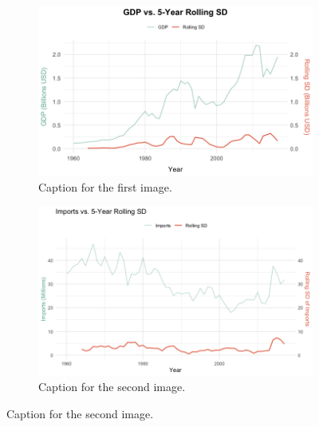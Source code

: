 \documentclass[11pt]{article}
\begin{document}
\begin{figure}[htbp]
  \begin{subfigure}[b]{0.48\textwidth}
    \centering
    \includegraphics[width=\linewidth]{EDA/GDP_RollingSD5.png} %
    \caption{Caption for the first image.}
    \label{fig:side:a}
  \end{subfigure}
  \hfill
  \begin{subfigure}[b]{0.48\textwidth}
    \centering
    \includegraphics[width=\linewidth]{EDA/Imports_RollingSD5.png} %
    \caption{Caption for the second image.}
    \label{fig:side:b}
  \end{subfigure}
  

\end{figure}
\end{document}
